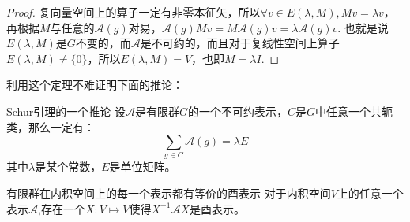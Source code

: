 \begin{proof}
    复向量空间上的算子一定有非零本征矢，所以$\forall v\in E(\lambda,M),Mv=\lambda v$，再根据$M$与任意的$\mathscr{A}(g)$对易，$\mathscr{A}(g)Mv=M\mathscr{A}(g)v=\lambda\mathscr{A}(g)v$.
    也就是说$E(\lambda,M)$是$G$不变的，而$\mathscr{A}$是不可约的，而且对于复线性空间上算子$E(\lambda,M)\neq \{0\}$，所以$E(\lambda,M)=V$，也即$M=\lambda I$.
\end{proof}
利用这个定理不难证明下面的推论：
\begin{proposition}{Schur引理的一个推论}
	设$\mathscr{A}$是有限群$G$的一个不可约表示，$C$是$G$中任意一个共轭类，那么一定有：
	\[\sum\limits_{g\in C}\mathcal{A}(g)=\lambda E\]
	其中$\lambda$是某个常数，$E$是单位矩阵。
\end{proposition}
\begin{theorem}{有限群在内积空间上的每一个表示都有等价的酉表示}	
	对于内积空间$V$上的任意一个表示$\mathscr{A}$,存在一个$X:V\mapsto V$使得$X^{-1}\mathscr{A}X$是酉表示。
\end{theorem}
